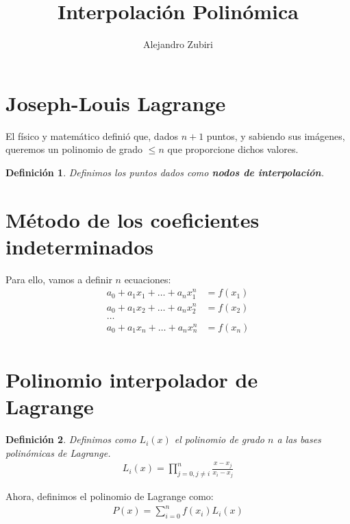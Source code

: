 \documentclass{article}
\author{Alejandro Zubiri}
\title{Interpolación Polinómica}
\newtheorem{defi}{Definición}
\begin{document}
\maketitle
\section{Joseph-Louis Lagrange}
El físico y matemático definió que, dados $n+1$ puntos, y sabiendo sus imágenes, queremos un polinomio de grado $\leq n$ que proporcione dichos valores.
\begin{defi}
	Definimos los puntos dados como \textbf{nodos de interpolación}.
\end{defi}
\section{Método de los coeficientes indeterminados}
Para ello, vamos a definir $n$ ecuaciones:
\begin{equation}
	\begin{split}
		a_0 +a_1x_1+\dots+a_nx_1^n&=f(x_1)\\
		a_0+a_1x_2+\dots + a_nx_2^n &= f(x_2)\\
		\dots\\
		a_0+a_1x_n+\dots+ a_nx_n^n &= f(x_n)\\
	\end{split}
\end{equation}
\section{Polinomio interpolador de Lagrange}
\begin{defi}
	Definimos como $L_i(x)$ el polinomio de grado $n$ a las bases polinómicas de Lagrange.
	\begin{equation}
		\begin{split}
			L_i(x)= \prod_{j=0, j \neq i}^n \frac{x-x_j}{x_i-x_j}
		\end{split}
	\end{equation}
\end{defi}
Ahora, definimos el polinomio de Lagrange como:
\begin{equation}
	\begin{split}
		P(x)=\sum_{i=0}^n f(x_i)L_i(x)
	\end{split}
\end{equation}
\end{document}
